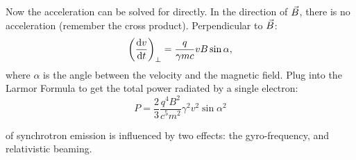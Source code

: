\begin{enumerate}
      Now the acceleration can be solved for directly. In the direction of $\vec B$,
      there is no acceleration (remember the cross product). Perpendicular to $\vec B$:
      \begin{equation}
        \left(\frac{{\rm d} v}{{\rm d} t}\right)_{\perp} = \frac{q}{\gamma mc} vB \sin{\alpha},
      \end{equation}
      where $\alpha$ is the angle between the velocity and the magnetic field.
      Plug into the Larmor Formula to get the total power radiated by a single electron:
      \begin{equation}\boxed{
        P = \frac{2}{3} \frac{q^{4}B^{2}}{c^{5}m^{2}} \gamma^{2} v^{2} \sin{\alpha}^{2}
      }\end{equation} 
      
       of synchrotron emission is influenced
      by two effects: the gyro-frequency, and relativistic beaming.


\end{enumerate}

